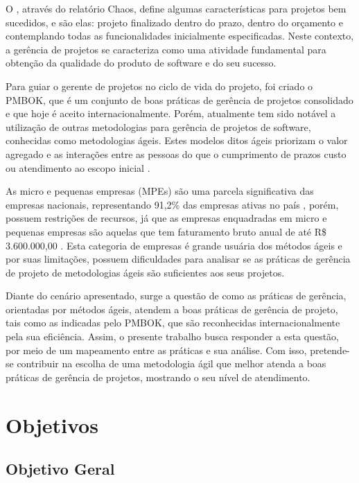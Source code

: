 \documentclass[
    12pt,               %
    openright,          %
    twoside,            %
    a4paper,            %
    chapter=TITLE,     %
    english,            %
    spanish,            %
    portuguese              %
    ]{abntex2}
\begin{document}
O , através do relatório Chaos, define algumas características para projetos bem sucedidos, e são elas: projeto finalizado dentro do prazo, dentro do orçamento e contemplando todas as funcionalidades inicialmente especificadas. Neste contexto, a gerência de projetos se caracteriza como uma atividade fundamental para obtenção da qualidade do produto de software e do seu sucesso.

Para guiar o gerente de projetos no ciclo de vida do projeto, foi criado o PMBOK, que é um conjunto de boas práticas de gerência de projetos consolidado e que hoje é aceito internacionalmente. Porém, atualmente tem sido notável a utilização de outras metodologias para gerência de projetos de software, conhecidas como metodologias ágeis. Estes modelos ditos ágeis priorizam o valor agregado e as interações entre as pessoas do que o cumprimento de prazos custo ou atendimento ao escopo inicial \cite[p.~xxi]{prikladnickiAtAll}.

As micro e pequenas empresas (MPEs) são uma parcela significativa das empresas nacionais, representando 91,2\% das empresas ativas no país \cite{ibpt2016}, porém, possuem restrições de recursos, já que as empresas enquadradas em micro e pequenas empresas são aquelas que tem faturamento bruto anual de até R\$ 3.600.000,00 \cite{brasil2006}. Esta categoria de empresas é grande usuária dos métodos ágeis e por suas limitações, possuem dificuldades para analisar se as práticas de gerência de projeto de metodologias ágeis são suficientes aos seus projetos.

Diante do cenário apresentado, surge a questão de como as práticas de gerência, orientadas por métodos ágeis, atendem a boas práticas de gerência de projeto, tais como as indicadas pelo PMBOK, que são reconhecidas internacionalmente pela sua eficiência. Assim, o presente trabalho busca responder a esta questão, por meio de um mapeamento  entre as práticas e sua análise. Com isso, pretende-se contribuir na escolha de uma metodologia ágil que melhor atenda a boas práticas de gerência de projetos, mostrando o seu nível de atendimento.


\section{Objetivos}

\subsection{Objetivo Geral}
\end{document}
